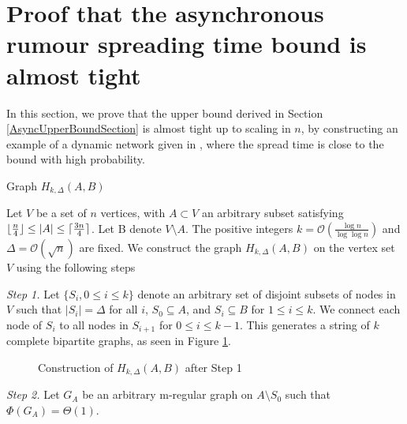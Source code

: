 \section{Proof that the asynchronous rumour spreading time bound is almost tight}\label{section:asyncBoundTight}
\label{section:AsyncLowerBound}

In this section, we prove that the upper bound derived in Section \ref{AsyncUpperBoundSection} is almost tight up to scaling in $n$, by constructing an example of a dynamic network given in \cite{asyncPaper}, where the spread time is close to the bound with high probability.

\begin{definition}\label{def:HkAB}
 	Graph $H_{k, \Delta}(A,B)$

	Let $V$ be a set of $n$ vertices, with $A \subset V$ an arbitrary subset satisfying $\lfloor\frac{n}{4}\rfloor \leq |A| \leq \lceil\frac{3n}{4}\rceil$. %
	Let B denote $V \setminus A$. The positive integers $k = \mathcal{O}\left(\frac{\log n}{\log \log n}\right)$ and $\Delta = \mathcal{O}(\sqrt{n})$ are fixed. We construct the graph $H_{k, \Delta}(A,B)$ on the vertex set $V$ using the following steps


	\textit{Step 1.} Let $\{S_i, 0 \leq i \leq k\}$ denote an arbitrary set of disjoint subsets of nodes in $V$ such that $|S_i| = \Delta$ for all $i$, $S_0 \subseteq A$, and $S_i \subseteq B$ for $1 \leq i \leq k$. We connect each node of $S_i$ to all nodes in $S_{i+1}$ for $0 \leq i \leq k - 1$. This generates a string of $k$ complete bipartite graphs, as seen in Figure \ref{fig:HkAB_1}.


    \begin{figure}[h]
        \centering
        
        \caption{Construction of $H_{k, \Delta}(A,B)$ after Step 1}
        \label{fig:HkAB_1}
    \end{figure}
    
	\textit{Step 2.} Let $G_A$ be an arbitrary m-regular %
	graph on $A \setminus S_0$ such that $\Phi(G_A) = \Theta(1)$. %



\end{definition}
